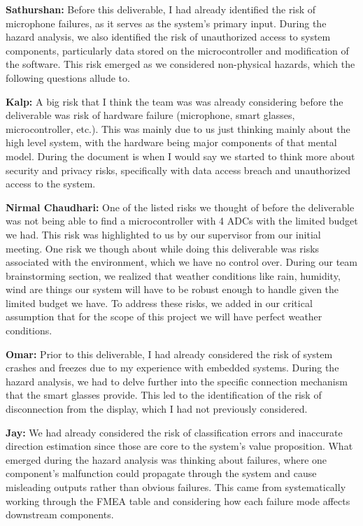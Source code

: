 \documentclass{article}
\begin{document}
\begin{enumerate}
    \textbf{Sathurshan:} Before this deliverable, I had already identified the
    risk of microphone failures, as it serves as the system's primary input.
    During the hazard analysis, we also identified the risk of unauthorized
    access to system components, particularly data stored on the microcontroller
    and modification of the software. This risk emerged as we considered
    non-physical hazards, which the following questions allude to.

    \textbf{Kalp:} A big risk that I think the team was was already considering
    before the deliverable was risk of hardware failure (microphone, smart
    glasses, microcontroller, etc.). This was mainly due to us just thinking
    mainly about the high level system, with the hardware being major components
    of that mental model. During the document is when I would say we started to
    think more about security and privacy risks, specifically with data access
    breach and unauthorized access to the system.
    
    \textbf{Nirmal Chaudhari:} One of the listed risks we thought of before the
    deliverable was not being able to find a microcontroller with 4 ADCs with
    the limited budget we had. This risk was highlighted to us by our supervisor
    from our initial meeting. One risk we though about while doing this
    deliverable was risks associated with the environment, which we have no
    control over. During our team brainstorming section, we realized that
    weather conditions like rain, humidity, wind are things our system will have
    to be robust enough to handle given the limited budget we have. To address
    these risks, we added in our critical assumption that for the scope of this
    project we will have perfect weather conditions. 

    \textbf{Omar:} Prior to this deliverable, I had already considered the risk
    of system crashes and freezes due to my experience with embedded systems.
    During the hazard analysis, we had to delve further into the specific
    connection mechanism that the smart glasses provide. This led to the
    identification of the risk of disconnection from the display, which I had
    not previously considered.

    \textbf{Jay:} We had already considered the risk of classification errors
    and inaccurate direction estimation since those are core to the system's
    value proposition. What emerged during the hazard analysis was thinking
    about failures, where one component's malfunction could propagate through
    the system and cause misleading outputs rather than obvious failures. This
    came from systematically working through the FMEA table and considering how
    each failure mode affects downstream components.


\end{enumerate}
\end{document}
